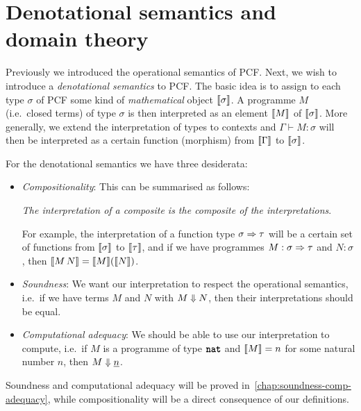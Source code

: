 \chapter[{Denotational semantics and domain theory}]{Denotational semantics and \\ domain theory}

Previously we introduced the operational semantics of PCF. Next, we wish to
introduce a \emph{denotational semantics} to PCF. The basic idea is to assign to
each type \(\sigma\) of PCF some kind of \emph{mathematical} object
\(\llbracket\sigma\rrbracket\).
%
A programme \(M\) (i.e.\ closed terms) of type \(\sigma\) is then interpreted as
an element \(\llbracket M\rrbracket\) of \(\llbracket\sigma\rrbracket\).
%
More generally, we extend the interpretation of types to contexts and
\(\Gamma \vdash M : \sigma\) will then be interpreted as a certain function
(morphism) from \(\llbracket\Gamma\rrbracket\) to \(\llbracket\sigma\rrbracket\).

For the denotational semantics we have three desiderata:

\begin{itemize}[itemsep=2mm,topsep=3mm]
\item\emph{Compositionality}: This can be summarised as follows:
  \begin{displayquote}
    \emph{The interpretation of a composite is the composite of the interpretations}.
  \end{displayquote}

  For example, the interpretation of a function type \(\sigma \Rightarrow \tau\)
  will be a certain set of functions from \(\llbracket\sigma\rrbracket\) to
  \(\llbracket\tau\rrbracket\), and if we have programmes \(M : \sigma \Rightarrow \tau\) and
  \(N : \sigma\), then \(\llbracket M \, N\rrbracket = \llbracket M\rrbracket(\llbracket N\rrbracket)\).
\item\emph{Soundness}: We want our interpretation to respect the operational
  semantics, i.e.\ if we have terms \(M\) and \(N\) with
  \(M \Downarrow N\), then their interpretations should be equal.
\item\emph{Computational adequacy}: We should be able to use our
  interpretation to compute, i.e.\ if \(M\) is a programme of type \(\texttt{\textbf{nat}}\)
  and \(\llbracket M\rrbracket = n\) for some natural number \(n\), then
  \(M \Downarrow \underline{n}\).
\end{itemize}

Soundness and computational adequacy will be proved
in~\cref{chap:soundness-comp-adequacy}, while compositionality will be a direct
consequence of our definitions.

